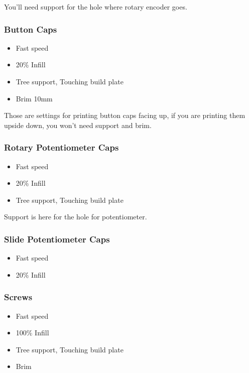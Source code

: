 \documentclass[12pt, a4paper]{article}
\begin{document}
				\noindent You'll need support for the hole where rotary encoder goes.
				
			\subsubsection{Button Caps}
				\begin{itemize}
					\item Fast speed
					\item 20\% Infill
					\item Tree support, Touching build plate
					\item Brim 10mm
				\end{itemize}
				
				\noindent Those are settings for printing button caps facing up, if you are printing them upside down, you won't need support and brim. 
				
			\subsubsection{Rotary Potentiometer Caps}
				\begin{itemize}
					\item Fast speed
					\item 20\% Infill
					\item Tree support, Touching build plate
				\end{itemize}
				
				\noindent Support is here for the hole for potentiometer.
				
			\subsubsection{Slide Potentiometer Caps}
				\begin{itemize}
					\item Fast speed
					\item 20\% Infill
				\end{itemize}
			
			\subsubsection{Screws}
				\begin{itemize}
					\item Fast speed
					\item 100\% Infill
					\item Tree support, Touching build plate
					\item Brim
				\end{itemize}
			
\end{document}
